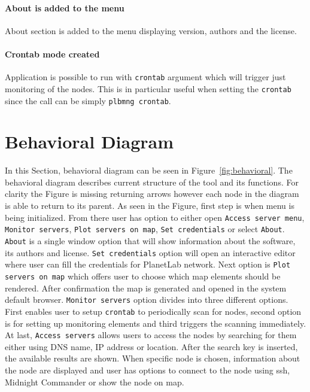 \paragraph{About is added to the menu}
About section is added to the menu displaying version, authors and the license.
\paragraph{Crontab mode created}
Application is possible to run with \texttt{crontab} argument which will trigger just monitoring of the nodes. This is in particular useful when setting the \texttt{crontab} since the call can be simply \texttt{plbmng crontab}. 
\section{Behavioral Diagram}
\label{section:toolbehavior}
In this Section, behavioral diagram can be seen in Figure~\ref{fig:behavioral}. The behavioral diagram describes current structure of the tool and its functions. For clarity the Figure is missing returning arrows however each node in the diagram is able to return to its parent. As seen in the Figure, first step is when menu is being initialized. From there user has option to either open \texttt{Access server menu}, \texttt{Monitor servers}, \texttt{Plot servers on map}, \texttt{Set credentials} or select \texttt{About}. \texttt{About} is a single window option that will show information about the software, its authors and license. \texttt{Set credentials} option will open an interactive editor where user can fill the credentials for PlanetLab network. Next option is \texttt{Plot servers on map} which offers user to choose which map elements should be rendered. After confirmation the map is generated and opened in the system default browser. \texttt{Monitor servers} option divides into three different options. First enables user to setup \texttt{crontab} to periodically scan for nodes, second option is for setting up monitoring elements and third triggers the scanning immediately. At last, \texttt{Access servers} allows users to access the nodes by searching for them either using DNS name, IP address or location. After the search key is inserted, the available results are shown. When specific node is chosen, information about the node are displayed and user has options to connect to the node using ssh, Midnight Commander or show the node on map.
